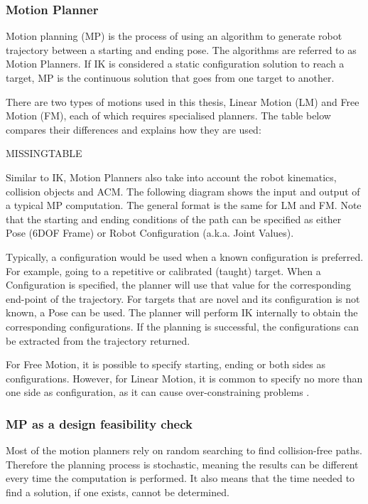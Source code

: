 \subsubsection{Motion Planner}

Motion planning (MP) is the process of using an algorithm to generate robot trajectory between a starting and ending pose. The algorithms are referred to as Motion Planners.  If IK is considered a static configuration solution to reach a target, MP is the continuous solution that goes from one target to another. 

There are two types of motions used in this thesis, Linear Motion (LM) and Free Motion (FM), each of which requires specialised planners. The table below compares their differences and explains how they are used: 


MISSINGTABLE

Similar to IK, Motion Planners also take into account the robot kinematics, collision objects and ACM. The following diagram shows the input and output of a typical MP computation. The general format is the same for LM and FM. Note that the starting and ending conditions of the path can be specified as either Pose (6DOF Frame) or Robot Configuration (a.k.a. Joint Values). 

Typically, a configuration would be used when a known configuration is preferred. For example, going to a repetitive or calibrated (taught) target. When a Configuration is specified, the planner will use that value for the corresponding end-point of the trajectory. For targets that are novel and its configuration is not known, a Pose can be used. The planner will perform IK internally to obtain the corresponding configurations. If the planning is successful, the configurations can be extracted from the trajectory returned.

For Free Motion, it is possible to specify starting, ending or both sides as configurations. However, for Linear Motion, it is common to specify no more than one side as configuration, as it can cause over-constraining problems \parencite{berensonTaskSpaceRegions2011}.

\subsubsection{MP as a design feasibility check}

Most of the motion planners rely on random searching to find collision-free paths. Therefore the planning process is stochastic, meaning the results can be different every time the computation is performed. It also means that the time needed to find a solution, if one exists, cannot be determined. 

